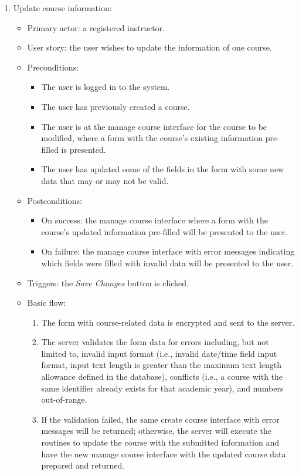 \begin{enumerate}
\item Update course information:
\begin{itemize}
    \item Primary actor: a registered instructor.
    \item User story: the user wishes to update the information of one course.
    \item Preconditions:
        \begin{itemize}
            \item The user is logged in to the system.
            \item The user has previously created a course.
            \item The user is at the manage course interface for the course to
                be modified, where a form with
                the course's existing information pre-filled is presented.
            \item The user has updated some of the fields in the form with some
                new data that may or may not be valid.
        \end{itemize}
    \item Postconditions:
        \begin{itemize}
            \item On success: the manage course interface where a form with
                the course's updated information pre-filled will be presented
                to the user.
            \item On failure: the manage course interface with error messages
                indicating which fields were filled with invalid data will be
                presented to the user.
        \end{itemize}
    \item Triggers: the \emph{Save Changes} button is clicked.
    \item Basic flow:
        \begin{enumerate}
            \item The form with course-related data is encrypted and sent to
                the server.
            \item The server validates the form data for errors including,
                but not limited to,
                invalid input format
                (i.e., invalid date/time field input format,
                input text length is greater than the maximum text length
                allowance defined in the database),
                conflicts (i.e., a course with the same identifier  
                already exists for that academic year),
                and numbers out-of-range.
            \item If the validation failed, the same create course interface
                with error messages will be returned; otherwise, the server will
                execute the routines to update the course with the submitted 
                information and have the new manage course interface with the
                updated course data prepared and returned.
        \end{enumerate}
\end{itemize}


\end{enumerate}
